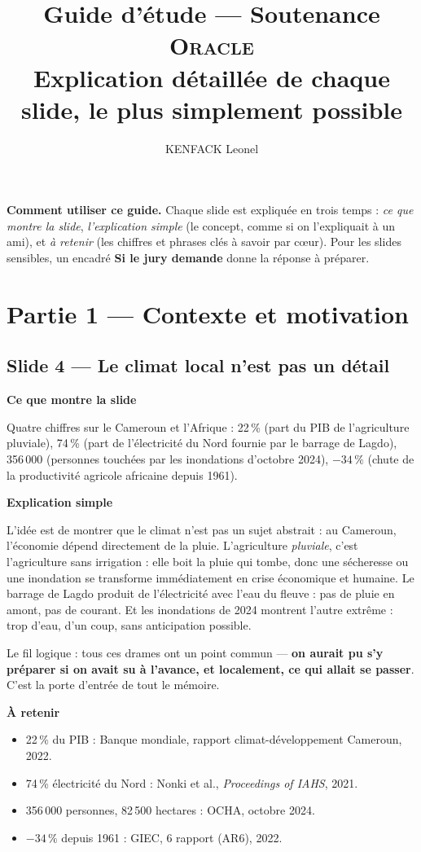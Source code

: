 \documentclass[11pt,a4paper]{article}
\title{\textcolor{bleu}{\textbf{Guide d'étude --- Soutenance \textsc{Oracle}}}\\
\large Explication détaillée de chaque slide, le plus simplement possible}
\author{KENFACK Leonel}
\date{}
\newcommand{\slide}[2]{\subsection*{\textcolor{bleu}{Slide #1 --- #2}}}
\newcommand{\bloc}[1]{\par\medskip\noindent\textcolor{accent}{\textbf{#1}}\par\nopagebreak\smallskip}
\begin{document}
\maketitle

\noindent\textbf{Comment utiliser ce guide.} Chaque slide est expliquée en trois temps : \emph{ce que montre la slide}, \emph{l'explication simple} (le concept, comme si on l'expliquait à un ami), et \emph{à retenir} (les chiffres et phrases clés à savoir par c\oe ur). Pour les slides sensibles, un encadré \textbf{Si le jury demande} donne la réponse à préparer.

\tableofcontents
\newpage

\section{Partie 1 --- Contexte et motivation}

\slide{4}{Le climat local n'est pas un détail}

\bloc{Ce que montre la slide}
Quatre chiffres sur le Cameroun et l'Afrique : 22\,\% (part du PIB de l'agriculture pluviale), 74\,\% (part de l'électricité du Nord fournie par le barrage de Lagdo), 356\,000 (personnes touchées par les inondations d'octobre 2024), $-34\,\%$ (chute de la productivité agricole africaine depuis 1961).

\bloc{Explication simple}
L'idée est de montrer que le climat n'est pas un sujet abstrait : au Cameroun, l'économie dépend directement de la pluie. L'agriculture \emph{pluviale}, c'est l'agriculture sans irrigation : elle boit la pluie qui tombe, donc une sécheresse ou une inondation se transforme immédiatement en crise économique et humaine. Le barrage de Lagdo produit de l'électricité avec l'eau du fleuve : pas de pluie en amont, pas de courant. Et les inondations de 2024 montrent l'autre extrême : trop d'eau, d'un coup, sans anticipation possible.

Le fil logique : tous ces drames ont un point commun --- \textbf{on aurait pu s'y préparer si on avait su à l'avance, et localement, ce qui allait se passer}. C'est la porte d'entrée de tout le mémoire.

\bloc{À retenir}
\begin{itemize}[nosep]
  \item 22\,\% du PIB : Banque mondiale, rapport climat-développement Cameroun, 2022.
  \item 74\,\% électricité du Nord : Nonki et al., \emph{Proceedings of IAHS}, 2021.
  \item 356\,000 personnes, 82\,500 hectares : OCHA, octobre 2024.
  \item $-34\,\%$ depuis 1961 : GIEC, 6 rapport (AR6), 2022.
\end{itemize}
\end{document}
